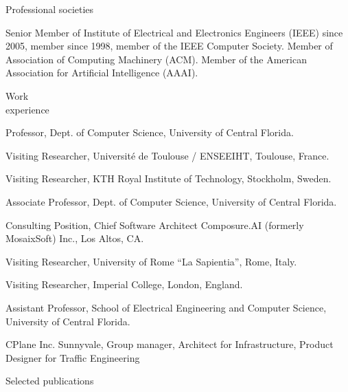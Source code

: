 \documentclass[10pt]{resume}
\begin{document}

\begin{category}{Professional societies}

\citembullet Senior Member of Institute of Electrical and Electronics
Engineers (IEEE) since 2005, member since 1998, member of the IEEE Computer
Society.
\citembullet Member of Association of Computing Machinery (ACM).
\citembullet Member of the  American Association for Artificial Intelligence
(AAAI).

\end{category}



\begin{category}{Work \\experience}


   Professor, Dept. of Computer Science, University of Central Florida.

   Visiting Researcher, Universit{\'e} de Toulouse / ENSEEIHT, Toulouse, France.

   Visiting Researcher, KTH Royal Institute of Technology, Stockholm, Sweden.

   Associate Professor, Dept. of Computer Science, University of Central Florida.

   Consulting Position, Chief Software Architect Composure.AI (formerly MosaixSoft) Inc., Los Altos, CA.

   Visiting Researcher, University of Rome ``La Sapientia'', Rome, Italy.

   Visiting Researcher, Imperial College, London, England.

   Assistant Professor, School of Electrical Engineering and Computer Science, University of Central Florida.

   CPlane Inc. Sunnyvale, Group manager, Architect for
  Infrastructure, Product Designer for Traffic Engineering

\end{category}

\clearpage

\begin{category}{Selected publications}
\citemnobullet{}

\vspace{-1.4cm}
\renewcommand\refname{ }


\end{category}

%

%


\end{document}
